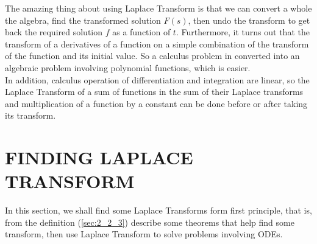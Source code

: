 \documentclass[11pt]{report}
\newcommand{\Fs}{F(s)}
\begin{document}
	The amazing thing about using Laplace Transform is that we can convert a whole the algebra, find the transformed solution $\Fs$, then undo the transform to get back the required solution $f$ as a function of $t$. Furthermore, it turns out that the transform of a derivatives of a function on a simple combination of the transform of the function and its initial value. So a calculus problem in converted into an algebraic problem involving polynomial functions, which is easier.\\
	
	In addition, calculus operation of differentiation and integration are linear, so the Laplace Transform of a sum of functions in the sum of their Laplace transforms and multiplication of a function by a constant can be done before or after taking its transform. 
	
	\section{FINDING LAPLACE TRANSFORM}
	In this section, we shall find some Laplace Transforms form first principle, that is, from the definition (\ref{sec:2_2_3}) describe some theorems that help find some transform, then use Laplace Transform to solve problems involving ODEs.
\end{document}
